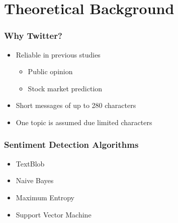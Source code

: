 
\section{Theoretical Background}

\begin{frame}
    \frametitle{Why Twitter?}

    \begin{itemize}
        \item Reliable in previous studies \citep{Barbosa2010}
        \begin{itemize}
            \item Public opinion \citep{Oconnor2010a,Patodkar2016a}
            \item Stock market prediction \citep{Bollen2011a,Mittal2012a,Nguyen2015a,Pagolu2016a,Zhang2011a}
        \end{itemize}

        \item Short messages of up to 280 characters \citep{Rosen2017}
        \item One topic is assumed due limited characters \citep{Pagolu2016a,Patodkar2016a}
    \end{itemize}
\end{frame}
  

\begin{frame}
    \frametitle{Sentiment Detection Algorithms}

    \begin{itemize}
        \item TextBlob
        \item Naive Bayes
        \item Maximum Entropy
        \item Support Vector Machine
    \end{itemize}
\end{frame}

